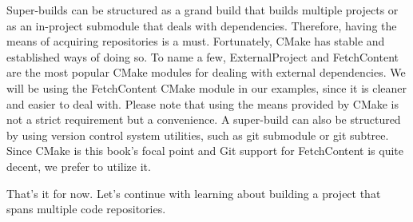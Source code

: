 Super-builds can be structured as a grand build that builds multiple projects or as an in-project submodule that deals with dependencies. Therefore, having the means of acquiring repositories is a must. Fortunately, CMake has stable and established ways of doing so. To name a few, ExternalProject and FetchContent are the most popular CMake modules for dealing with external dependencies. We will be using the FetchContent CMake module in our examples, since it is cleaner and easier to deal with. Please note that using the means provided by CMake is not a strict requirement but a convenience. A super-build can also be structured by using version control system utilities, such as git submodule or git subtree. Since CMake is this book's focal point and Git support for FetchContent is quite decent, we prefer to utilize it.

That's it for now. Let's continue with learning about building a project that spans multiple code repositories.